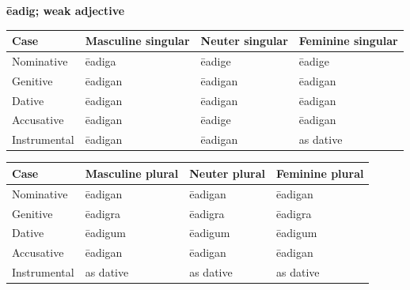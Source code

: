 \textbf{ēadig; weak adjective}

\par\begingroup
\fontsize{10.5}{13.2}\selectfont
\setlength{\LTleft}{0pt}\setlength{\LTright}{\fill}
\noindent
\begin{tabular}{@{}>{\raggedright\arraybackslash}p{22.0mm}>{\raggedright\arraybackslash}p{31.188mm}>{\raggedright\arraybackslash}p{31.188mm}>{\raggedright\arraybackslash}p{31.188mm}@{}}
\toprule
\textbf{Case} & \textbf{Masculine singular} & \textbf{Neuter singular} & \textbf{Feminine singular} \\
\midrule
Nominative & ēadiga & ēadige & ēadige \\
Genitive & ēadigan & ēadigan & ēadigan \\
Dative & ēadigan & ēadigan & ēadigan \\
Accusative & ēadigan & ēadige & ēadigan \\
Instrumental & ēadigan & ēadigan & as dative \\
\bottomrule
\end{tabular}
\par\endgroup
\par\addvspace{5pt}
\par\begingroup
\fontsize{10.5}{13.2}\selectfont
\setlength{\LTleft}{0pt}\setlength{\LTright}{\fill}
\noindent
\begin{tabular}{@{}>{\raggedright\arraybackslash}p{22.0mm}>{\raggedright\arraybackslash}p{31.188mm}>{\raggedright\arraybackslash}p{31.188mm}>{\raggedright\arraybackslash}p{31.188mm}@{}}
\toprule
\textbf{Case} & \textbf{Masculine plural} & \textbf{Neuter plural} & \textbf{Feminine plural} \\
\midrule
Nominative & ēadigan & ēadigan & ēadigan \\
Genitive & ēadigra & ēadigra & ēadigra \\
Dative & ēadigum & ēadigum & ēadigum \\
Accusative & ēadigan & ēadigan & ēadigan \\
Instrumental & as dative & as dative & as dative \\
\bottomrule
\end{tabular}
\par\endgroup

